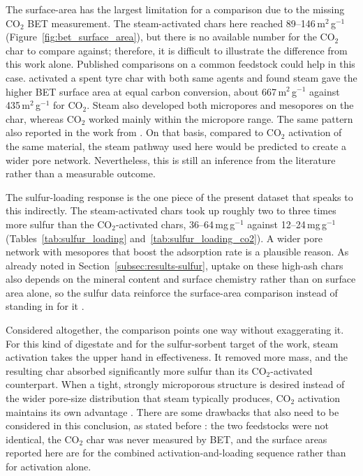 The surface-area has the largest limitation for a comparison due to the missing CO$_2$ BET measurement. The steam-activated chars here reached 89--146\,m$^2$\,g$^{-1}$ (Figure~\ref{fig:bet_surface_area}), but there is no available number for the CO$_2$ char to compare against; therefore, it is difficult to illustrate the difference from this work alone. Published comparisons on a common feedstock could help in this case. \textcite{Zhang2021TyreActivation} activated a spent tyre char with both same agents and found steam gave the higher BET surface area at equal carbon conversion, about 667\,m$^2$\,g$^{-1}$ against 435\,m$^2$\,g$^{-1}$ for CO$_2$. Steam also developed both micropores and mesopores on the char, whereas CO$_2$ worked mainly within the micropore range. The same pattern also reported in the work from \textcite{Sajjadi2019}. On that basis, compared to CO$_2$ activation of the same material, the steam pathway used here would be predicted to create a wider pore network. Nevertheless, this is still an inference from the literature rather than a measurable outcome. 

\vspace{0.3em}

The sulfur-loading response is the one piece of the present dataset that speaks to this indirectly. The steam-activated chars took up roughly two to three times more sulfur than the CO$_2$-activated chars, 36--64\,mg\,g$^{-1}$ against 12--24\,mg\,g$^{-1}$ (Tables~\ref{tab:sulfur_loading} and~\ref{tab:sulfur_loading_co2}). A wider pore network with mesopores that boost the adsorption rate is a plausible reason. As already noted in Section~\ref{subsec:results-sulfur}, uptake on these high-ash chars also depends on the mineral content and surface chemistry rather than on surface area alone, so the sulfur data reinforce the surface-area comparison instead of standing in for it \cite{Huang2022DigestateH2S}.
 
\vspace{0.3em}

Considered altogether, the comparison points one way without exaggerating it. For this kind of digestate and for the sulfur-sorbent target of the work, steam activation takes the upper hand in effectiveness. It removed more mass, and the resulting char absorbed significantly more sulfur than its CO$_2$-activated counterpart. When a tight, strongly microporous structure is desired instead of the wider pore-size distribution that steam typically produces, CO$_2$ activation maintains its own advantage \cite{Sajjadi2019}. There are some drawbacks that also need to be considered in this conclusion, as stated before : the two feedstocks were not identical, the CO$_2$ char was never measured by BET, and the surface areas reported here are for the combined activation-and-loading sequence rather than for activation alone. 


